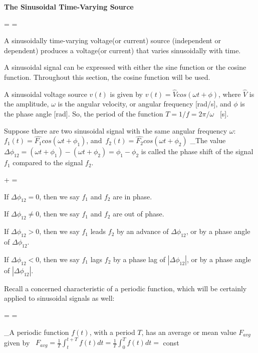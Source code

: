 \documentclass[a4paper,12pt,oneside]{report}
\newenvironment{tree}[4]{
\begin{list}{#1}{\parskip=0in \topsep=0in \itemsep=0in \parsep=0in \partopsep=0in \leftmargin=#2 \rightmargin=#3 \itemindent=#4 \listparindent=\itemindent}
}{\end{list}}
\newenvironment{ssection}[3]{
\framebox{\textbf{#1}} \textbf{#2}
\begin{tree}{#3}{0in}{0in}{\parindent}
}{\end{tree}}
\begin{document}
\begin{ssection}{1}{The Sinusoidal Time-Varying Source}{\textbullet}
\item A sinusoidally time-varying voltage(or current) source (independent or dependent) produces a voltage(or current) that varies sinusoidally with time.
\item A sinusoidal signal can be expressed with either the sine function or the cosine function. Throughout this section, the cosine function will be used.
\item A sinusoidal voltage source $v(t)$ is given by $v(t)=\widehat{V}cos(\omega t+\phi)$, where $\widehat{V}$ is the amplitude, $\omega$ is the angular velocity, or angular frequency [rad/s], and $\phi$ is the phase angle [rad]. So, the period of the function $T=1/f=2\pi/\omega$ \ [s].
\item Suppose there are two sinusoidal signal with the same angular frequency $\omega$:\newline \indent \qquad
$f_{1}(t)=\widehat{F_{1}}cos(\omega t+\phi_{1})$, and\ $f_{2}(t)=\widehat{F_{2}}cos(\omega t+\phi_{2})$ \newline \indent
\_The value $\Delta\phi_{12}=(\omega t+\phi_{1})-(\omega t+\phi_{2})=\phi_{1}-\phi_{2}$ is called the phase shift of the signal $f_{1}$ compared to the signal $f_{2}$.
\begin{tree}{+}{2\parindent}{0in}{0in}
\item If $\Delta\phi_{12}=0$, then we say $f_{1}$ and $f_{2}$ are in phase.
\item If $\Delta\phi_{12}\neq 0$, then we say $f_{1}$ and $f_{2}$ are out of phase.
\item If $\Delta\phi_{12}>0$, then we say $f_{1}$ leads $f_{2}$ by an advance of $\Delta\phi_{12}$, or by a phase angle of $\Delta\phi_{12}$.
\item If $\Delta\phi_{12}<0$, then we say $f_{1}$ lags $f_{2}$ by a phase lag of $|\Delta\phi_{12}|$, or by a phase angle of $|\Delta\phi_{12}|$.
\end{tree}
\item Recall a concerned characteristic of a periodic function, which will be certainly applied to sinusoidal signals as well:
\begin{tree}{{}}{\parindent}{0in}{0in}
\item \_A periodic function $f(t)$, with a period $T$, has an average or mean value $F_{avg}$ given by \
$F_{avg}=\displaystyle\frac{1}{T}\int_{t}^{t+T}{f(t)dt}=\frac{1}{T}\int_{0}^{T}{f(t)dt}=$ const \\ 

\end{tree}
\end{ssection}
\end{document}

